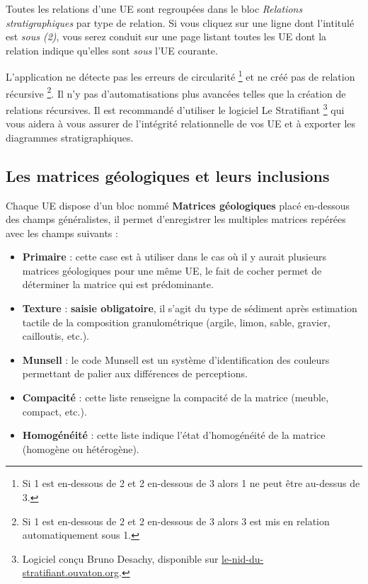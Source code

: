 \documentclass[letterpaper,10pt,french]{sphinxmanual}
\begin{document}
Toutes les relations d'une UE sont regroupées dans le bloc \emph{Relations stratigraphiques} par type de relation. Si vous cliquez sur une ligne dont l'intitulé est \emph{sous (2)}, vous serez conduit sur une page listant toutes les UE dont la relation indique qu'elles sont \emph{sous} l'UE courante.

L'application ne détecte pas les erreurs de circularité \footnote{
Si 1 est en-dessous de 2 et 2 en-dessous de 3 alors 1 ne peut être au-dessus de 3.
} et ne créé pas de relation récursive \footnote{
Si 1 est en-dessous de 2 et 2 en-dessous de 3 alors 3 est mis en relation automatiquement sous 1.
}. Il n'y pas d'automatisations plus avancées telles que la création de relations récursives. Il est recommandé d'utiliser le logiciel Le Stratifiant \footnote{
Logiciel conçu Bruno Desachy, disponible sur \href{http://le-nid-du-stratifiant.ouvaton.org/}{le-nid-du-stratifiant.ouvaton.org}.
} qui vous aidera à vous assurer de l'intégrité relationnelle de vos UE et à exporter les diagrammes stratigraphiques.


\subsection{Les matrices géologiques et leurs inclusions}
\label{manuel/formulaire_ue:les-matrices-geologiques-et-leurs-inclusions}
Chaque UE dispose d'un bloc nommé \textbf{Matrices géologiques} placé en-dessous des champs généralistes, il permet d'enregistrer les multiples matrices repérées avec les champs suivants :
\begin{itemize}
\item {} 
\textbf{Primaire} : cette case est à utiliser dans le cas où il y aurait plusieurs matrices géologiques pour une même UE, le fait de cocher permet de déterminer la matrice qui est prédominante.

\item {} 
\textbf{Texture} : \textbf{saisie obligatoire}, il s'agit du type de sédiment après estimation tactile de la composition granulométrique (argile, limon, sable, gravier, cailloutis, etc.).

\item {} 
\textbf{Munsell} : le code Munsell est un système d’identification des couleurs permettant de palier aux différences de perceptions.

\item {} 
\textbf{Compacité} : cette liste renseigne la compacité de la matrice (meuble, compact, etc.).

\item {} 
\textbf{Homogénéité} : cette liste indique l'état d'homogénéité de la matrice (homogène ou hétérogène).

\end{itemize}
\end{document}
